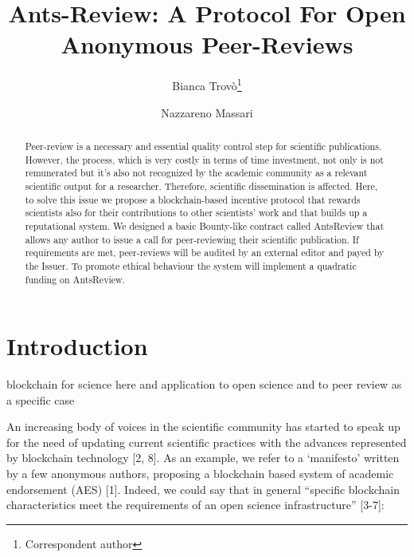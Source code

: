 \documentclass[runningheads]{llncs}
\begin{document}
%
\title{Ants-Review: A Protocol For Open Anonymous Peer-Reviews}
%
%
\author{Bianca Trovò\thanks{Correspondent author} \and
Nazzareno Massari}
%
%
%
\maketitle              %
%
\begin{abstract}
Peer-review is a necessary and essential quality control step for scientific publications. However, the process, which is very costly in terms of time investment, not only is not remunerated but it’s also not recognized by the academic community as a relevant scientific output for a researcher. Therefore, scientific dissemination is affected. Here, to solve this issue we propose a blockchain-based incentive protocol that rewards scientists also for their contributions to other scientists’ work and that builds up a reputational system. We designed a basic Bounty-like contract called AntsReview that allows any author to issue a call for peer-reviewing their scientific publication. If requirements are met, peer-reviews will be audited by an external editor and payed by the Issuer. To promote ethical behaviour the system will implement a quadratic funding on AntsReview.
\end{abstract}
%
%
\section{Introduction}
blockchain for science here and application to open science and to peer review as a specific case

An increasing body of voices in the scientific community has started to speak up for the need of updating current scientific practices with the advances represented by blockchain technology [2, 8]. As an example, we refer to a ‘manifesto’ written by a few anonymous authors, proposing a blockchain based system of academic endorsement (AES) [1]. Indeed, we could say that in general “specific blockchain characteristics meet the requirements of an open science infrastructure” [3-7]:
\end{document}
